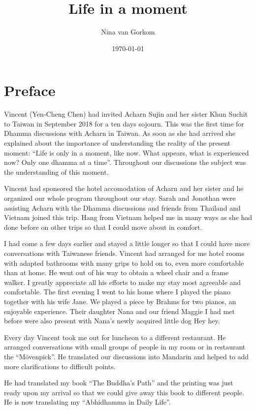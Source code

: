 \documentclass{book}
\title{Life in a moment}
\author{Nina van Gorkom}
\date{\today}
\begin{document}
\maketitle



\thispagestyle{empty}

\section*{Preface}


Vincent (Yen-Cheng Chen) had invited Acharn Sujin and her
sister Khun Suchit to Taiwan in September 2018 for a ten days sojourn.
This was the first time for Dhamma discussions with Acharn in Taiwan. As
soon as she had arrived she explained about the importance of
understanding the reality of the present moment: ``Life is only in a
moment, like now. What appears, what is experienced now? Only one dhamma
at a time''. Throughout our discussions the subject was the
understanding of this moment. 

Vincent had sponsored the hotel accomodation of Acharn and
her sister and he organized our whole program throughout our stay. Sarah
and Jonothan were assisting Acharn with the Dhamma discussions and
friends from Thailand and Vietnam joined this trip. Hang from Vietnam
helped me in many ways as she had done before on other trips so that I
could move about in comfort. 

I had come a few days earlier and stayed a little longer so
that I could have more conversations with Taiwanese friends. Vincent had
arranged for me hotel rooms with adapted bathrooms with many grips to
hold on to, even more comfortable than at home. He went out of his way
to obtain a wheel chair and a frame walker. I greatly appreciate all his
efforts to make my stay most agreeable and comfortable. The first
evening I went to his home where I played the piano together with his
wife Jane. We played a piece by Brahms for two pianos, an enjoyable
experience. Their daughter Nana and our friend Maggie I had met before
were also present with Nana's newly acquired little dog Hey hey. 

Every day Vincent took me out for luncheon to a different
restaurant. He arranged conversations with small groups of people in my
room or in restaurant the ``Mövenpick''. He translated our discussions
into Mandarin and helped to add more clarifications to difficult
points.

He had translated my book ``The Buddha's Path'' and the
printing was just ready upon my arrival so that we could give away this
book to different people. He is now translating my ``Abhidhamma in
Daily Life''. 
\end{document}
